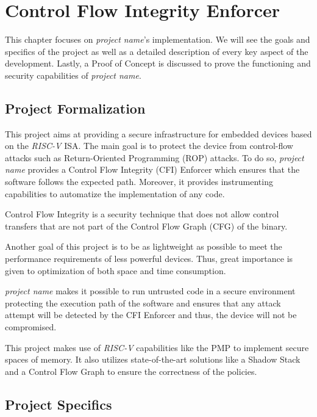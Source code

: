 \chapter{Control Flow Integrity Enforcer}
\label{cha:project}

This chapter focuses on \textit{project name}'s implementation. We will see the
goals and specifics of the project as well as a detailed description of every
key aspect of the development. Lastly, a Proof of Concept is discussed to prove
the functioning and security capabilities of \textit{project name}.

\section{Project Formalization}
\label{sec:project_formalization}

This project aims at providing a secure infrastructure for embedded devices
based on the \textit{RISC-V} ISA. The main goal is to protect the device from
control-flow attacks such as Return-Oriented Programming (ROP) attacks. To do so,
\textit{project name} provides a Control Flow Integrity (CFI) Enforcer which ensures
that the software follows the expected path. Moreover, it provides instrumenting
capabilities to automatize the implementation of any code.

Control Flow Integrity is a security technique that does not allow control transfers
that are not part of the Control Flow Graph (CFG) of the binary.

Another goal of this project is to be as lightweight as possible to meet the performance
requirements of less powerful devices. Thus, great importance is given to optimization
of both space and time consumption.

\textit{project name} makes it possible to run untrusted code in a secure
environment protecting the execution path of the software and ensures that any
attack attempt will be detected by the CFI Enforcer and thus, the device will not
be compromised.

This project makes use of \textit{RISC-V} capabilities like the PMP to implement
secure spaces of memory. It also utilizes state-of-the-art solutions like a Shadow
Stack and a Control Flow Graph to ensure the correctness of the policies.

\section{Project Specifics}
\label{sec:project_specifics}

